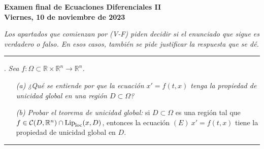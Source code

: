 \documentclass[11pt]{report}
\newcommand{\R}{\mathbb R}
\begin{document}
\begin{center}
    \textbf{Examen final de Ecuaciones Diferenciales II} \\
    \textbf{Viernes, 10 de noviembre de 2023}
\end{center}

\noindent \textit{Los apartados que comienzan por (V-F) piden decidir si el enunciado que sigue es verdadero o falso. En esos casos, también se pide justificar la respuesta que se dé.}

\vspace{4mm}

\hrule

\vspace{4mm}

. \textit{Sea $f \colon \Omega \subset \R \times \R^n \to \R^n$.}
\begin{itemize}
    \item[\textit{(a)}] \textit{¿Qué se entiende por que la ecuación $x'=f(t,x)$ tenga la propiedad de unicidad global en una región $D \subset \Omega$?}
    \item[\textit{(b)}] \textit{Probar el teorema de unicidad global:} si $D \subset \Omega$ es una región tal que $f \in \mathcal{C}(D,\R^n)\cap \textup{Lip}_{\textup{loc}}(x,D)$, entonces la ecuación $(E) \ x'=f(t,x)$ tiene la propiedad de unicidad global en $D$.
\end{itemize}

\vspace{2mm}

\hrule

\vspace{2mm}
\end{document}
